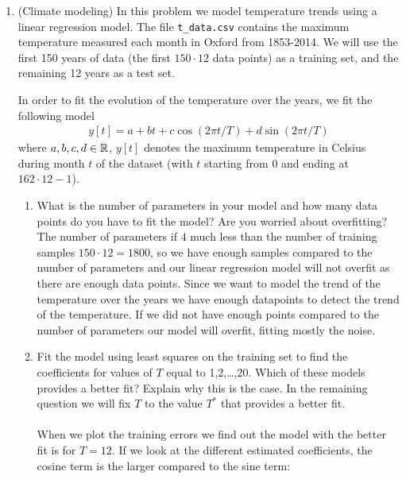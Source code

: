 \documentclass[12pt,twoside]{article}
\begin{document}
\begin{enumerate}
\begin{enumerate}
\end{enumerate}
 
\newpage

\item  (Climate modeling) In this problem we model temperature trends using a linear regression model. The file 
\texttt{t\_data.csv} contains the maximum temperature measured
  each month in Oxford from 1853-2014.  We will use the first
  150 years of data (the first $150\cdot 12$ data points) as a training set, and
  the remaining 12 years as a test set.

 In order to fit the evolution of the temperature over the years, we fit the following model
  \begin{align}
  y[t] = a + bt + c \cos(2\pi t/T) + d\sin(2\pi  t/T)
  \end{align}
  where $a,b,c,d\in\mathbb{R}$, $y[t]$ denotes the maximum temperature in Celsius during month $t$ of the dataset (with $t$ starting from $0$ and ending at $162\cdot 12-1$).
   
  \begin{enumerate}
  \item What is the number of parameters in your model and how many data points do you have to fit the model? Are you worried about overfitting?\\
  The number of parameters if $4$ much less than the number of training samples $150\cdot 12 = 1800$, so we have enough samples compared to the number of parameters and our linear regression model will not overfit as there are enough data points.
  Since we want to model the trend of the temperature over the years we have enough datapoints to detect the trend of the  temperature. If we did not have enough points compared to the number of parameters our model will overfit, fitting mostly the noise.
  
  \item Fit the model using least squares on the training set to
    find the coefficients for values of $T$ equal to 1,2,\ldots,20. Which of these models provides a better fit? Explain why this is the case. In the remaining question we will fix $T$ to the value $T^{\ast}$ that provides a better fit.\\ \\

    When we plot the training errors we find out the model with the better fit is for $T=12$.  If we look at the different estimated coefficients, the cosine term is the larger compared to the sine term:
      

\end{enumerate}
\end{enumerate}
\end{document}
